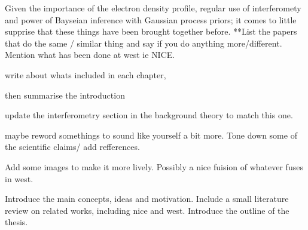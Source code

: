 Given the importance of the electron density profile, regular use of interferomety and power of Bayseian inference with Gaussian process priors; it comes to little supprise that these things have been brought together before. **List the papers that do the same / similar thing and say if you do anything more/different. Mention what has been done at west ie NICE. 


write about whats included in each chapter, 

then summarise the introduction

update the interferometry section in the background theory to match this one.

maybe reword somethings to sound like yourself a bit more. Tone down some of the scientific claims/ add refferences.

Add some images to make it more lively. Possibly a nice fuision of whatever fuses in west. 

Introduce the main concepts, ideas and motivation. Include a small literature review on related works, including \gls{nice} and \gls{west}. Introduce the outline of the thesis.





